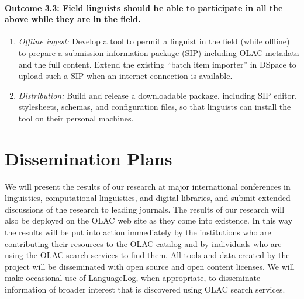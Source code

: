 \def\task{3.3}
\paragraph{Outcome {\task}: Field linguists should be able to participate in all the
    above while they are in the field.}

\begin{enumerate}[label=\emph{\task\alph*}]
\item \emph{Offline ingest:}
  Develop a tool to permit a linguist in the field (while offline) to
  prepare a submission information package (SIP) including OLAC
  metadata and the full content. 
  Extend the existing ``batch item importer'' in DSpace to 
  upload such a SIP when an internet connection is available.
\item \emph{Distribution:}
  Build and release a downloadable package, including SIP editor,
  stylesheets, schemas, and configuration files, so that linguists
  can install the tool on their personal machines.
\end{enumerate}

\section{Dissemination Plans}
\label{sec:dissemination}

We will present the results of our research at major international
conferences in linguistics, computational linguistics, and
digital libraries, and submit extended discussions of the research to
leading journals.  The results of our research will also be deployed
on the OLAC web site as they come into existence. In this way the
results will be put into action immediately by the institutions
who are contributing their resources to the OLAC catalog and by 
individuals who are using the OLAC search services to find them.
All tools and data created by the project will be
disseminated with open source and open content licenses.
We will make occasional use of LanguageLog, when appropriate, to
disseminate information of broader interest that is discovered using
OLAC search services.
